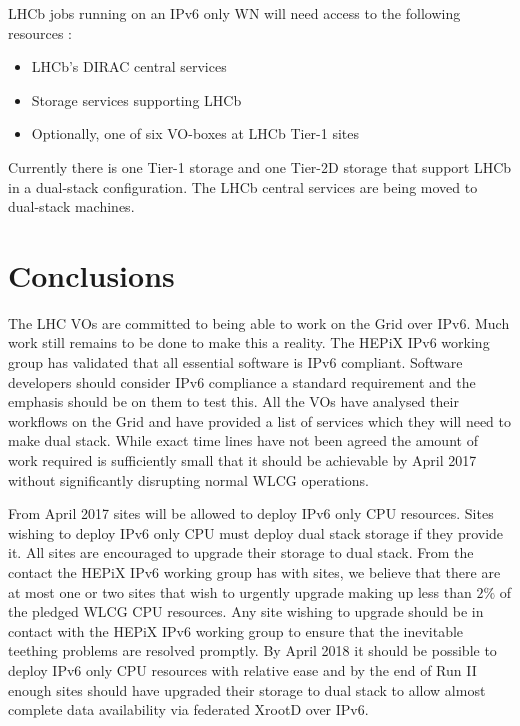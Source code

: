 \documentclass[a4paper]{jpconf}
\begin{document}
LHCb jobs running on an IPv6 only WN will need access to the following resources :
\begin{itemize}
\item LHCb's DIRAC central services
\item Storage services supporting LHCb
\item Optionally, one of six VO-boxes at LHCb Tier-1 sites
\end{itemize}
Currently there is one Tier-1 storage and one Tier-2D storage that support LHCb in a dual-stack configuration.  The LHCb central services are being moved to dual-stack machines.  


\section{Conclusions}
The LHC VOs are committed to being able to work on the Grid over IPv6.  Much work still remains to be done to make this a reality.  The HEPiX IPv6 working group has validated that all essential software is IPv6 compliant.  Software developers should consider IPv6 compliance a standard requirement and the emphasis should be on them to test this.  All the VOs have analysed their workflows on the Grid and have provided a list of services which they will need to make dual stack.  While exact time lines have not been agreed the amount of work required is sufficiently small that it should be achievable by April 2017 without significantly disrupting normal WLCG operations.

From April 2017 sites will be allowed to deploy IPv6 only CPU resources. Sites wishing to deploy IPv6 only CPU must deploy dual stack storage if they provide it.  All sites are encouraged to upgrade their storage to dual stack.  From the contact the HEPiX IPv6 working group has with sites, we believe that there are at most one or two sites that wish to urgently upgrade making up less than $2\%$ of the pledged WLCG CPU resources.  Any site wishing to upgrade should be in contact with the HEPiX IPv6 working group to ensure that the inevitable teething problems are resolved promptly.  By April 2018 it should be possible to deploy IPv6 only CPU resources with relative ease and by the end of Run II enough sites should have upgraded their storage to dual stack to allow almost complete data availability via federated XrootD over IPv6. 


\end{document}
